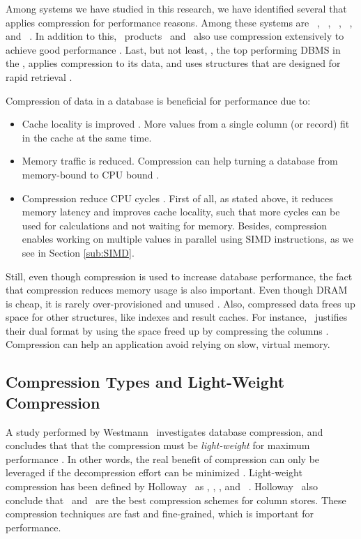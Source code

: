 Among systems we have studied in this research, we have identified several that applies compression for performance reasons. Among these systems are \ibm~\cite{Raman2013-em}, \cstore~\cite{Stonebraker2005-qz}, \vertica~\cite{Lamb2012-kg}, \oracle~\cite{Oracle2015-fs}, and \gorilla~\cite{Pelkonen2015-ko}. In addition to this, \bd~products \tableau~and \qlikview~also use compression extensively to achieve good performance \cite{Kamkolkar2015-iq, Qlik2014-vd}. Last, but not least, \exasol, the top performing DBMS in the \tpch, applies compression to its data, and uses structures that are designed for rapid retrieval \cite{Exasol2014-xh}.


Compression of data in a database is beneficial for performance due to:
\begin{itemize}
  \item Cache locality is improved \cite{Exasol2014-xh}. More values from a single column (or record) fit in the cache at the same time.
  \item Memory traffic is reduced. Compression can help turning a database from memory-bound to CPU bound \cite{Willhalm2009-hu}.
  \item Compression reduce CPU cycles \cite{Stonebraker2005-qz}. First of all, as stated above, it reduces memory latency and improves cache locality, such that more cycles can be used for calculations and not waiting for memory. Besides, compression enables working on multiple values in parallel using SIMD instructions, as we see in Section \ref{sub:SIMD}.
\end{itemize}

Still, even though compression is used to increase database performance, the fact that compression reduces memory usage is also important. Even though DRAM is cheap, it is rarely over-provisioned and unused \cite{Barber2014-ey}. Also, compressed data frees up space for other structures, like indexes and result caches. For instance, \oracle~justifies their dual format by using the space freed up by compressing the columns \cite{Lahiri2015-mz, Lamb2012-kg}. Compression can help an application avoid relying on slow, virtual memory.

\subsection{Compression Types and Light-Weight Compression}
\label{sub:Compression Types and Light-Weight Compression}
A study performed by Westmann \ea~investigates database compression, and concludes that that the compression must be \textit{light-weight} for maximum performance \cite{Westmann2000-mz}. In other words, the real benefit of compression can only be leveraged if the decompression effort can be minimized \cite{Lemke2010-is}. Light-weight compression has been defined by Holloway \ea~as \bp, \de, \dele, and \rle~\cite{Holloway2008-rr}. Holloway \ea~also conclude that \de~and \rle~are the best compression schemes for column stores. These compression techniques are fast and fine-grained, which is important for performance.

